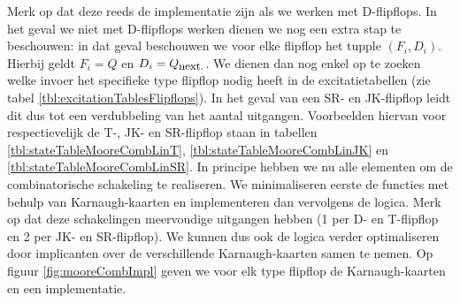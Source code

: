 \begin{table}[hbt]
\caption{Voorstelling van de transitiefunctie van de Moore-machine.}
\label{tbl:stateTableMooreCombLin}
\end{table}
Merk op dat deze reeds de implementatie zijn als we werken met D-flipflops. In het geval we niet met D-flipflops werken dienen we nog een extra stap te beschouwen: in dat geval beschouwen we voor elke flipflop het tupple $\left(F_i,D_i\right)$. Hierbij geldt $F_i=Q$ en $D_i=Q_{\mbox{\small{next.}}}$. We dienen dan nog enkel op te zoeken welke invoer het specifieke type flipflop nodig heeft in de excitatietabellen (zie tabel \ref{tbl:excitationTablesFlipflops}). In het geval van een SR- en JK-flipflop leidt dit dus tot een verdubbeling van het aantal uitgangen. Voorbeelden hiervan voor respectievelijk de T-, JK- en SR-flipflop staan in tabellen \ref{tbl:stateTableMooreCombLinT}, \ref{tbl:stateTableMooreCombLinJK} en \ref{tbl:stateTableMooreCombLinSR}. In principe hebben we nu alle elementen om de combinatorische schakeling te realiseren. We minimaliseren eerste de functies met behulp van Karnaugh-kaarten en implementeren dan vervolgens de logica. Merk op dat deze schakelingen meervoudige uitgangen hebben (1 per D- en T-flipflop en 2 per JK- en SR-flipflop). We kunnen dus ook de logica verder optimaliseren door implicanten over de verschillende Karnaugh-kaarten samen te nemen. Op figuur \ref{fig:mooreCombImpl} geven we voor elk type flipflop de Karnaugh-kaarten en een implementatie.
